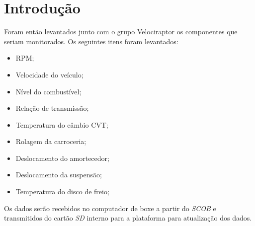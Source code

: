 \chapter{Introdução} 
	\label{ch:intro}
Foram então levantados junto com o grupo Velociraptor os componentes que seriam monitorados. Os seguintes itens foram levantados: 
\begin{itemize}
	\item RPM;
	\item Velocidade do veículo;
	\item Nível do combustível;
	\item Relação de transmissão;
	\item Temperatura do câmbio CVT;
	\item Rolagem da carroceria;
	\item Deslocamento do amortecedor;
	\item Deslocamento da suspensão;
	\item Temperatura do disco de freio;
\end{itemize}
\newpage

Os dados serão recebidos no computador de boxe a partir do \textit{SCOB} e transmitidos do cartão \textit{SD} interno para a plataforma para atualização dos dados.  